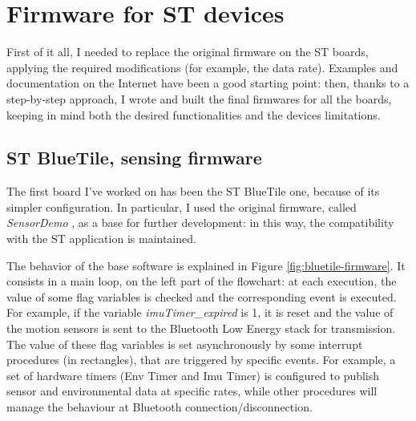 \section{Firmware for ST devices}
First of it all, I needed to replace the original firmware on the ST boards, applying the required modifications (for example, the data rate). Examples and documentation on the Internet have been a good starting point: then, thanks to a step-by-step approach, I wrote and built the final firmwares for all the boards, keeping in mind both the desired functionalities and the devices limitations. 

\subsection{ST BlueTile, sensing firmware}
The first board I've worked on has been the ST BlueTile one, because of its simpler configuration. In particular, I used the original firmware, called \textit{SensorDemo} \cite{bluetilesdk}, as a base for further development: in this way, the compatibility with the ST application is maintained.

The behavior of the base software is explained in Figure \ref{fig:bluetile-firmware}. It consists in a main loop, on the left part of the flowchart: at each execution, the value of some flag variables is checked and the corresponding event is executed. For example, if the variable \textit{imuTimer\_expired} is 1, it is reset and the value of the motion sensors is sent to the Bluetooth Low Energy stack for transmission. The value of these flag variables is set asynchronously by some interrupt procedures (in rectangles), that are triggered by specific events. For example, a set of hardware timers (Env Timer and Imu Timer) is configured to publish sensor and environmental data at specific rates, while other procedures will manage the behaviour at Bluetooth connection/disconnection. 

